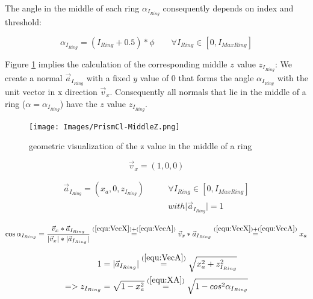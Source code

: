 \documentclass[../ClassicThesis.tex]{subfiles}
\begin{document}
The angle in the middle of each ring ${\alpha}_{I_{Ring}}$ consequently depends on index and threshold:

\begin{equation}
\label{equ:AlphaIRing}
    {\alpha}_{I_{Ring}} = (I_{Ring} + 0.5) * \phi \qquad \forall{ I_{Ring} \in [0, I_{MaxRing}] }
\end{equation}



Figure \ref{fig:middleZ} implies the calculation of the corresponding middle $z$ value $z_{I_{Ring}}$: We create a normal $\vec{a}_{I_{Ring}}$ with a fixed $y$ value of 0 that forms the angle ${\alpha}_{I_{Ring}}$ with the unit vector in x direction $\vec{v}_{x}$. Consequently all normals that lie in the middle of a ring ($\alpha = {\alpha}_{I_{Ring}}$) have the $z$ value $z_{I_{Ring}}$.

\begin{figure}
    \texttt{[image: Images/PrismCl-MiddleZ.png]}
    \caption{geometric visualization of the z value in the middle of a ring}
    \label{fig:middleZ}
\end{figure}

\begin{equation}
\label{equ:VecX}
    \vec{v}_{x} = (1, 0, 0)
\end{equation}

\begin{equation}
\begin{split}
    \label{equ:VecA}
    \vec{a}_{I_{Ring}} = (x_{a}, 0, z_{I_{Ring}}) \qquad  & \forall{ I_{Ring} \in [0, I_{MaxRing}] } \\
    & with \vert \vec{a}_{I_{Ring}} \vert = 1
\end{split}
\end{equation}

\begin{equation}
    \label{equ:XA}
    \cos{{\alpha}_{I_{Ring}}} = \frac{ \vec{v}_{x} * \vec{a}_{I_{Ring}} }{ \vert \vec{v}_{x} \vert * \vert \vec{a}_{I_{Ring}} \vert }
    \stackrel{(\ref{equ:VecX}) + (\ref{equ:VecA})}{=} \vec{v}_{x} * \vec{a}_{I_{Ring}}
    \stackrel{(\ref{equ:VecX}) + (\ref{equ:VecA})}{=} x_{a}
\end{equation}

\begin{equation}
\label{equ:ZIRing}
\begin{split}
    1 & = \vert \vec{a}_{I_{Ring}} \vert \stackrel{(\ref{equ:VecA})}{=} \sqrt{ x_{a}^{2} + z_{I_{Ring}}^{2} } \\
    => z_{I_{Ring}} & = \sqrt{1 - x_{a}^{2}}
    \stackrel{(\ref{equ:XA})}{=} \sqrt{1 - cos^{2}{{\alpha}_{I_{Ring}}}}
\end{split}
\end{equation}
\end{document}
